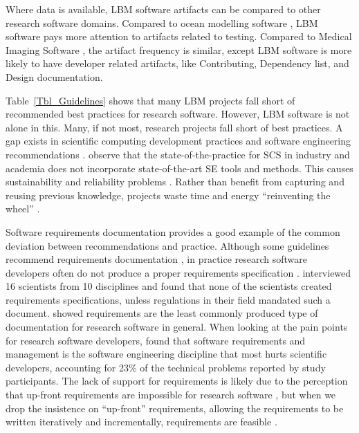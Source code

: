 \documentclass[final, 3p, times, authoryear]{elsarticle}
\begin{document}
Where data is available, LBM software artifacts can be compared to other
research software domains.  Compared to ocean modelling software
\citep{JungEtAl2022}, LBM software pays more attention to artifacts related to
testing.  Compared to Medical Imaging Software \citep{Dong2021}, the artifact
frequency is similar, except LBM software is more likely to have developer
related artifacts, like Contributing, Dependency list, and Design documentation.

Table~\ref{Tbl_Guidelines} shows that many LBM projects fall short of
recommended best practices for research software.  However, LBM software is not
alone in this.  Many, if not most, research projects fall short of best
practices.   A gap exists in scientific computing development practices and
software engineering recommendations \citep{Storer2017, Kelly2007,
OwojaiyeEtAl2021_CSE}. \citet{JohansonAndHasselbring2018} observe that the
state-of-the-practice for SCS in industry and academia does not incorporate
state-of-the-art SE tools and methods.  This causes sustainability and
reliability problems \citep{FaulkEtAl2009}. Rather than benefit from capturing
and reusing previous knowledge, projects waste time and energy ``reinventing the
wheel'' \citep{deSouzaEtAl2019}. 

Software requirements documentation provides a good example of the common
deviation between recommendations and practice.  Although some guidelines
recommend requirements documentation \citep{TobiasEtAl2018, HerouxEtAl2008,
SmithAndKoothoor2016}, in practice research software developers often do not
produce a proper requirements specification \citep{HeatonAndCarver2015}.
\citet{SandersAndKelly2008} interviewed 16 scientists from 10 disciplines and
found that none of the scientists created requirements specifications, unless
regulations in their field mandated such a document. \citet{Nguyen-HoanEtAl2010}
showed requirements are the least commonly produced type of documentation for
research software in general. When looking at the pain points for research
software developers, \citet{WieseEtAl2019} found that software requirements and
management is the software engineering discipline that most hurts scientific
developers, accounting for 23\% of the technical problems reported by study
participants.  The lack of support for requirements is likely due to the
perception that up-front requirements are impossible for research software
\citep{CarverEtAl2007,SegalAndMorris2008}, but when we drop the insistence on
``up-front'' requirements, allowing the requirements to be written
iteratively and incrementally, requirements are feasible \citep{Smith2016}.
\end{document}
